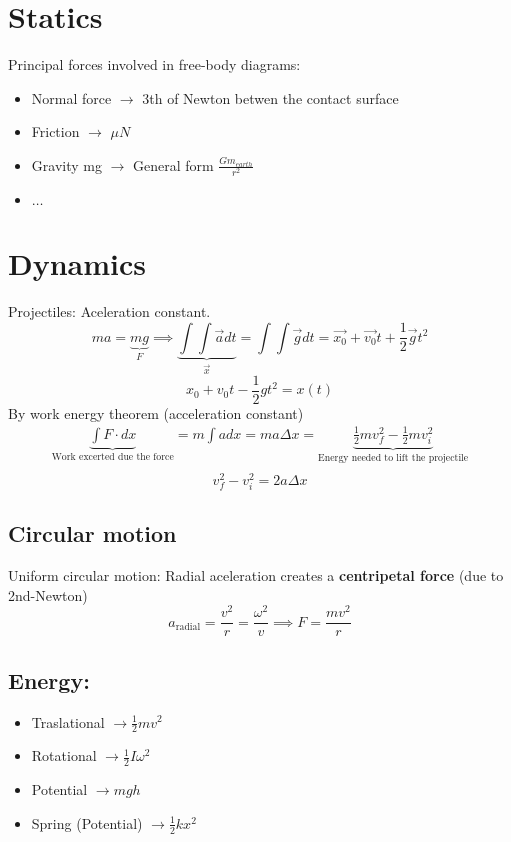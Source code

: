 \section{Statics}
Principal forces involved in free-body diagrams:
\begin{itemize}
    \item Normal force    $\rightarrow$ 3th of Newton betwen the contact surface
    \item Friction $\rightarrow$ $\mu N$
    \item Gravity   mg $\rightarrow$ General form $\frac{Gm_{earth}}{r^2}$
    \item $\dots$
\end{itemize}
\section{Dynamics}
Projectiles:
Aceleration constant. 
$$ma=\underbrace{mg}_{F}\implies \underbrace{\int \int \vec{a} dt}_{\vec{x}} =\int \int \vec{g} dt= \vec{x_0}+\vec{v_0} t+\frac{1}{2}\vec{g}t^2$$
$$\boxed{x_0+v_0t-\frac{1}{2}gt^2=x(t)}$$
By work energy theorem (acceleration constant)
\begin{align*}
\underbrace{\int F \cdot dx }_{\text{Work excerted due the force}}= m\int a dx=ma\Delta x =\underbrace{\frac{1}{2}mv_f^2-\frac{1}{2}mv_i^2}_{\text{Energy needed to lift the projectile}}\\
\end{align*}
$$\boxed{v_f^2-v_i^2 =2a\Delta x}$$
\subsection{Circular motion}
Uniform circular motion:
Radial aceleration creates a {\bf centripetal force} (due to 2nd-Newton)
$$\boxed{a_{\text{radial}}=\frac{v^2}{r}} =\frac{\omega^2}{v}\implies F=\frac{mv^2}{r}$$




\subsection{Energy:}
\begin{itemize}
    \item Traslational $\rightarrow\boxed{ \frac{1}{2}mv^2}$
    \item Rotational   $\rightarrow \boxed{\frac{1}{2}I\omega^2}$
    \item Potential $\rightarrow\boxed{ mgh}$
    \item Spring (Potential) $\rightarrow \boxed{\frac{1}{2}kx^2}$
\end{itemize}

